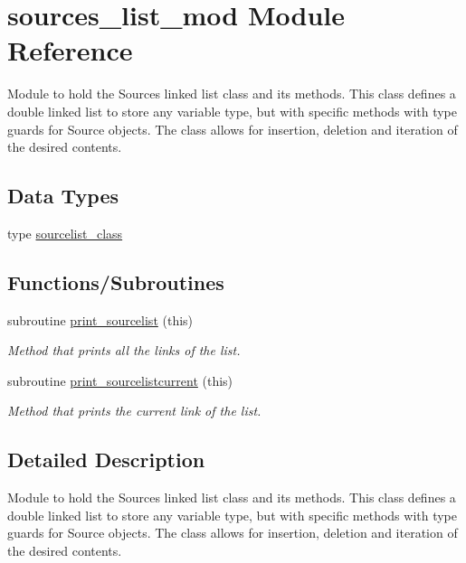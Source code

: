\hypertarget{namespacesources__list__mod}{}\section{sources\+\_\+list\+\_\+mod Module Reference}
\label{namespacesources__list__mod}


Module to hold the Sources linked list class and its methods. This class defines a double linked list to store any variable type, but with specific methods with type guards for Source objects. The class allows for insertion, deletion and iteration of the desired contents.  


\subsection*{Data Types}
\begin{DoxyCompactItemize}
\item 
type \mbox{\hyperlink{structsources__list__mod_1_1sourcelist__class}{sourcelist\+\_\+class}}
\end{DoxyCompactItemize}
\subsection*{Functions/\+Subroutines}
\begin{DoxyCompactItemize}
\item 
subroutine \mbox{\hyperlink{namespacesources__list__mod_ac9ab885c3cc6a38c8b12b694e40a11e1}{print\+\_\+sourcelist}} (this)
\begin{DoxyCompactList}\small\item\em Method that prints all the links of the list. \end{DoxyCompactList}\item 
subroutine \mbox{\hyperlink{namespacesources__list__mod_aad2008cc97f57cd85297d3f3d81fac39}{print\+\_\+sourcelistcurrent}} (this)
\begin{DoxyCompactList}\small\item\em Method that prints the current link of the list. \end{DoxyCompactList}\end{DoxyCompactItemize}


\subsection{Detailed Description}
Module to hold the Sources linked list class and its methods. This class defines a double linked list to store any variable type, but with specific methods with type guards for Source objects. The class allows for insertion, deletion and iteration of the desired contents. 

